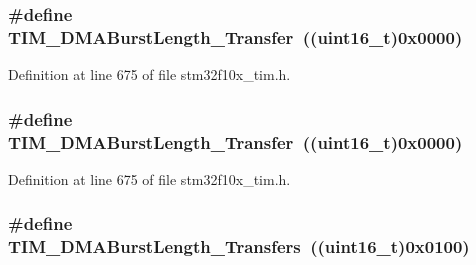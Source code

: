 \subsubsection[{\texorpdfstring{T\+I\+M\+\_\+\+D\+M\+A\+Burst\+Length\+\_\+1\+Transfer}{TIM_DMABurstLength_1Transfer}}]{\setlength{\rightskip}{0pt plus 5cm}\#define T\+I\+M\+\_\+\+D\+M\+A\+Burst\+Length\+\_\+Transfer~(({\bf uint16\+\_\+t})0x0000)}\hypertarget{group___t_i_m___d_m_a___burst___length_gab87f91f1c5583b9888cb6bb37fc639e2}{}\label{group___t_i_m___d_m_a___burst___length_gab87f91f1c5583b9888cb6bb37fc639e2}


Definition at line 675 of file stm32f10x\+\_\+tim.\+h.

\subsubsection[{\texorpdfstring{T\+I\+M\+\_\+\+D\+M\+A\+Burst\+Length\+\_\+1\+Transfer}{TIM_DMABurstLength_1Transfer}}]{\setlength{\rightskip}{0pt plus 5cm}\#define T\+I\+M\+\_\+\+D\+M\+A\+Burst\+Length\+\_\+Transfer~(({\bf uint16\+\_\+t})0x0000)}\hypertarget{group___t_i_m___d_m_a___burst___length_gab87f91f1c5583b9888cb6bb37fc639e2}{}\label{group___t_i_m___d_m_a___burst___length_gab87f91f1c5583b9888cb6bb37fc639e2}


Definition at line 675 of file stm32f10x\+\_\+tim.\+h.

\subsubsection[{\texorpdfstring{T\+I\+M\+\_\+\+D\+M\+A\+Burst\+Length\+\_\+2\+Transfers}{TIM_DMABurstLength_2Transfers}}]{\setlength{\rightskip}{0pt plus 5cm}\#define T\+I\+M\+\_\+\+D\+M\+A\+Burst\+Length\+\_\+Transfers~(({\bf uint16\+\_\+t})0x0100)}\hypertarget{group___t_i_m___d_m_a___burst___length_ga829504c3e8c90a9445f6a223bc3034f8}{}\label{group___t_i_m___d_m_a___burst___length_ga829504c3e8c90a9445f6a223bc3034f8}


